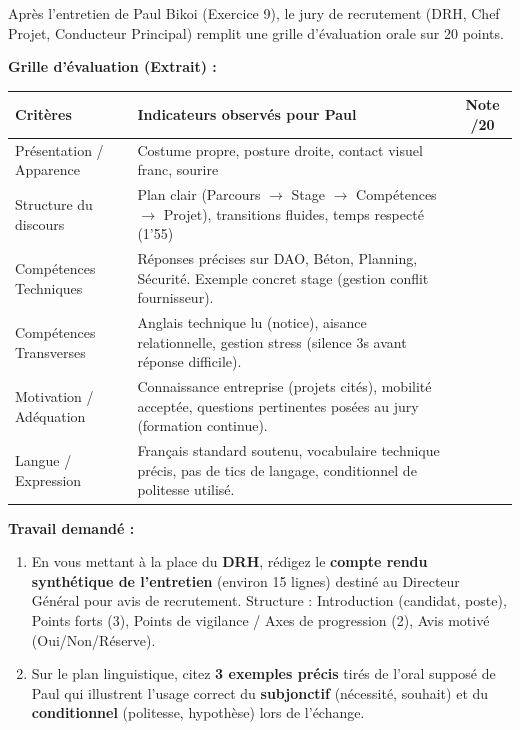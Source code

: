 \documentclass[11pt]{article}
\begin{document}
\begin{exercice}
Après l'entretien de Paul Bikoi (Exercice 9), le jury de recrutement (DRH, Chef Projet, Conducteur Principal) remplit une grille d'évaluation orale sur 20 points.

\textbf{Grille d'évaluation (Extrait) :}
\begin{center}
\begin{tabularx}{\linewidth}{|l|X|c|}
\hline
\textbf{Critères} & \textbf{Indicateurs observés pour Paul} & \textbf{Note /20} \\
\hline
Présentation / Apparence & Costume propre, posture droite, contact visuel franc, sourire & \\
\hline
Structure du discours & Plan clair (Parcours $\to$ Stage $\to$ Compétences $\to$ Projet), transitions fluides, temps respecté (1'55) & \\
\hline
Compétences Techniques & Réponses précises sur DAO, Béton, Planning, Sécurité. Exemple concret stage (gestion conflit fournisseur). & \\
\hline
Compétences Transverses & Anglais technique lu (notice), aisance relationnelle, gestion stress (silence 3s avant réponse difficile). & \\
\hline
Motivation / Adéquation & Connaissance entreprise (projets cités), mobilité acceptée, questions pertinentes posées au jury (formation continue). & \\
\hline
Langue / Expression & Français standard soutenu, vocabulaire technique précis, pas de tics de langage, conditionnel de politesse utilisé. & \\
\hline
\end{tabularx}
\end{center}

\textbf{Travail demandé :}
\begin{enumerate}
    \item En vous mettant à la place du \textbf{DRH}, rédigez le \textbf{compte rendu synthétique de l'entretien} (environ 15 lignes) destiné au Directeur Général pour avis de recrutement. Structure : Introduction (candidat, poste), Points forts (3), Points de vigilance / Axes de progression (2), Avis motivé (Oui/Non/Réserve).
    \item Sur le plan linguistique, citez \textbf{3 exemples précis} tirés de l'oral supposé de Paul qui illustrent l'usage correct du \textbf{subjonctif} (nécessité, souhait) et du \textbf{conditionnel} (politesse, hypothèse) lors de l'échange.
\end{enumerate}
\end{exercice}
\end{document}
